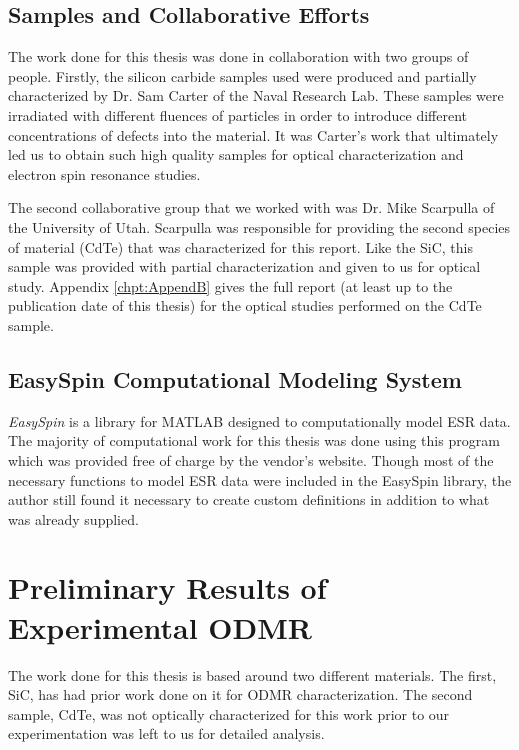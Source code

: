 \documentclass[oneside, astronomy, noacknowlegments]{BYUPhys}
\begin{document}
\subsection{Samples and Collaborative Efforts}

The work done for this thesis was done in collaboration with two groups of people. Firstly, the silicon carbide samples used were produced and partially characterized by Dr. Sam Carter of the Naval Research Lab. These samples were irradiated with different fluences of particles in order to introduce different concentrations of defects into the material. It was Carter's work that ultimately led us to obtain such high quality samples for optical characterization and electron spin resonance studies.

The second collaborative group that we worked with was Dr. Mike Scarpulla of the University of Utah. Scarpulla was responsible for providing the second species of material (CdTe) that was characterized for this report. Like the SiC, this sample was provided with partial characterization and given to us for optical study. Appendix \ref{chpt:AppendB} gives the full report (at least up to the publication date of this thesis) for the optical studies performed on the CdTe sample.

\subsection{EasySpin Computational Modeling System}

\textit{EasySpin} is a library for MATLAB designed to computationally model ESR data. The majority of computational work for this thesis was done using this program which was provided free of charge by the vendor's website. Though most of the necessary functions to model ESR data were included in the EasySpin library, the author still found it necessary to create custom definitions in addition to what was already supplied.


\section{Preliminary Results of Experimental ODMR}

The work done for this thesis is based around two different materials. The first, SiC, has had prior work done on it for ODMR characterization. The second sample, CdTe, was not optically characterized for this work prior to our experimentation was left to us for detailed analysis.
\end{document}
